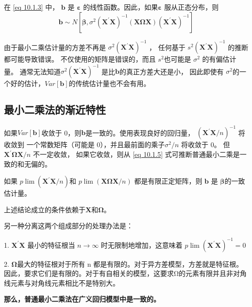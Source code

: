     在 \eqref{eq 10.1.3} 中， $ \boldsymbol{b} $ 是 $ \boldsymbol{\varepsilon} $ 的线性函数。因此，如果$ \boldsymbol{\varepsilon} $  服从正态分布，则
    $$ \boldsymbol{b} \sim N \left[\boldsymbol{\beta}, \sigma^{2}\left(\boldsymbol{X^{\prime} X}\right)^{-1}
            (\boldsymbol{X \Omega X})\left(\boldsymbol{X^{\prime} X}\right)^{-1}\right] $$

    由于最小二乘估计量的方差不再是 $ \sigma^{2}\left(\boldsymbol{X^{\prime} X}\right)^{-1} $ ，
    任何基于 $ s^{2}\left(\boldsymbol{X^{\prime} X}\right)^{-1} $ 的推断都可能导致错误。
    不仅使用的矩阵是错误的，而且 $ s^{2} $也可能是 $ \sigma^{2} $ 的有偏估计量。
    通常无法知道$ \sigma^{2}\left(\boldsymbol{X^{\prime} X}\right)^{-1} $ 是比$ \boldsymbol{b} $的真正方差大还是小，
    因此即使有 $ \sigma^{2} $的一个好的估计，$ Var[\boldsymbol{b}] $的传统估计量也不会有用。

\subsection{最小二乘法的渐近特性}
    如果$ Var[\boldsymbol{b}] $收敛于 0，则$ \boldsymbol{b} $是一致的。使用表现良好的回归量， 
    $ \left(\boldsymbol{X^{\prime} X} / n\right)^{-1} $ 将收敛到
    一个常数矩阵（可能是 0），并且最前面的乘子$ \sigma^{2} / n$ 将收敛于 0。
    但 $ \boldsymbol{X^{\prime} \Omega X} / n $ 不一定收敛，
    如果它收敛，则从 \eqref{eq 10.1.5} 式可推断普通最小二乘是一致的和无偏的。

    \begin{theorem}
        如果 $ p \lim \left( \boldsymbol{X^{\prime} X} / n\right) $和 
        $ p \lim (\boldsymbol{X \Omega X} / n) $  都是有限正定矩阵，则 $ \boldsymbol{b} $ 是 $ \boldsymbol{\beta} $的一致估计量。
    \end{theorem}

    上述结论成立的条件依赖于$ \boldsymbol{X} $和$ \boldsymbol{\Omega} $。

    另一种分离这两个组成部分的处理办法是：
    
    1. $ \boldsymbol{X^{\prime} X}$ 最小的特征根当 $ n \to \infty $ 时无限制地增加，这意味着 $p \lim \left(\boldsymbol{X^{\prime} X}\right)^{-1}=0 $

    2. $ \boldsymbol{\Omega} $最大的特征根对于所有 n 都是有限的。对于异方差模型，方差就是特征根。
    因此，要求它们是有限的。对于有自相关的模型，这要求Ω的元素有限并且非对角线元素与对角线元素相比不是特别大。
    
    {\bf 那么，普通最小二乘法在广义回归模型中是一致的。}

